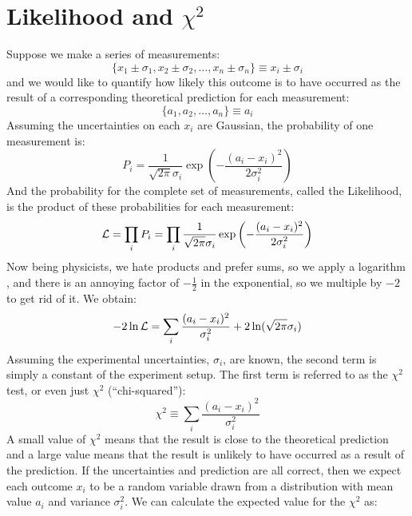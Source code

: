 \documentclass[12pt,oneside]{book}
\begin{document}
\section{Likelihood and $\chi^2$ }

Suppose we make a series of measurements:
\begin{displaymath}
\{x_1 \pm \sigma_1, x_2 \pm \sigma_2, \ldots, x_n \pm \sigma_n \} \equiv x_i \pm \sigma_i
\end{displaymath}
and we would like to quantify how likely this outcome is to have occurred as the result of a corresponding theoretical prediction for each measurement:
\begin{displaymath}
\{a_1, a_2, \ldots, a_n \} \equiv a_i
\end{displaymath}
Assuming the uncertainties on each $x_i$ are Gaussian, the probability of one measurement is:
\begin{displaymath}
P_i = \frac{1}{\sqrt{2 \pi} \sigma_i}  \exp\left( - \frac{(a_i-x_i)^2}{2\sigma_i^2}\right)
\end{displaymath}
And the probability for the complete set of measurements, called the Likelihood, is the product of these probabilities for each measurement:
\begin{displaymath}
{\cal L} = \prod_i P_i = \prod_i \frac{1}{\sqrt{2 \pi} \sigma_i}  \exp\left( - \frac{(a_i-x_i)^2}{2\sigma_i^2}\right)
\end{displaymath}
Now being physicists, we hate products and prefer sums, so we apply a logarithm , and there is an annoying factor of $-\frac{1}{2}$ in the exponential, so we multiple by $-2$ to get rid of it.  We obtain:
\begin{equation}
-2 \ln {\cal L} = \sum_i \frac{(a_i-x_i)^2}{\sigma_i^2} + 2 \ln(\sqrt{2\pi}\sigma_i)
\end{equation}
Assuming the experimental uncertainties, $\sigma_i$, are known, the
second term is simply a constant of the experiment setup.  The first
term is referred to as the $\chi^2$ test, or even just $\chi^2$ (``chi-squared''):
\begin{equation}
\chi^2 \equiv \sum_i \frac{(a_i-x_i)^2}{\sigma_i^2} 
\end{equation}
A small value of $\chi^2$ means that the result is close to the
theoretical prediction and a large value means that the result is
unlikely to have occurred as a result of the prediction.  If the
uncertainties and prediction are all correct,
then we expect each outcome $x_i$ to be a random variable drawn from a distribution with mean value $a_i$ and variance $\sigma_i^2$.  We can calculate the expected value for the $\chi^2$ as:
\end{document}
